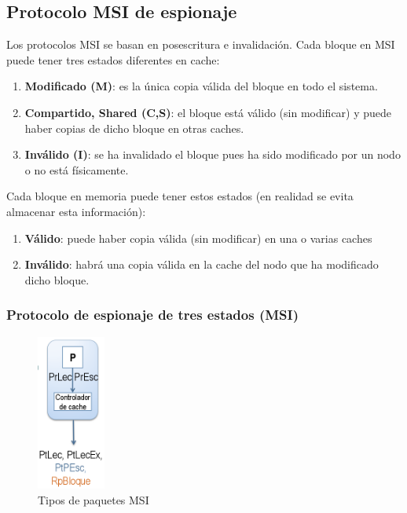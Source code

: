 \documentclass[10pt,a4paper,spanish]{report}
\begin{document}
\textcolor[rgb]{0.2,0.4,0.8}{\subsection{Protocolo MSI de espionaje}}
Los protocolos MSI se basan en posescritura e invalidación. Cada bloque en MSI puede tener tres estados diferentes en cache:
\begin{enumerate}[\color{azul}{$\heartsuit$}]
    \item \textcolor[rgb]{0.2,0.4,0.8}{\textbf{Modificado (M)}}: es la única copia válida del bloque en todo el sistema.
    \item \textcolor[rgb]{0.2,0.4,0.8}{\textbf{Compartido, Shared (C,S)}}: el bloque está válido (sin modificar) y puede haber copias de dicho bloque en otras caches.
    \item \textcolor[rgb]{0.2,0.4,0.8}{\textbf{Inválido (I)}}: se ha invalidado el bloque pues ha sido modificado por un nodo o no está físicamente.
\end{enumerate}

Cada bloque en memoria puede tener estos estados (en realidad se evita almacenar esta información):
\begin{enumerate}[\color{azul}{\bf $\heartsuit$}]
    \item \textcolor[rgb]{0.2,0.4,0.8}{\textbf{Válido}}: puede haber copia válida (sin modificar) en una o varias caches
    \item \textcolor[rgb]{0.2,0.4,0.8}{\textbf{Inválido}}: habrá una copia válida en la cache del nodo que ha modificado dicho bloque.
\end{enumerate}

\textcolor[rgb]{0.2,0.4,0.8}{\subsubsection{Protocolo de espionaje de tres estados (MSI)}}
\begin{figure}[!h]
\centering
\includegraphics[width=0.2\textwidth]{72}
\caption{Tipos de paquetes MSI}
\label{pkg_MSI}
\end{figure}
\end{document}
